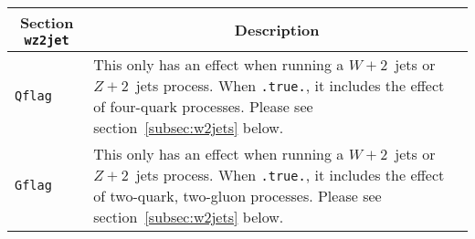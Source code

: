 	\begin{longtable}{p{1.5cm}p{12cm}}
		\hline
		\multicolumn{1}{c}{{\textbf{Section} \texttt{wz2jet}}} & \multicolumn{1}{c}{{\textbf{Description}}} \\
		\hline
		\texttt{Qflag} &
		This only has an effect when running a
		$W+2$~jets or $Z+2$~jets process. When {\tt.true.}, it includes the effect of four-quark processes. Please see section~\ref{subsec:w2jets}
		below. \\
		\texttt{Gflag} &
		This only has an effect when running a
		$W+2$~jets or $Z+2$~jets process. When {\tt.true.}, it includes the effect of two-quark, two-gluon processes.
                Please see section~\ref{subsec:w2jets}
		below. \\
		\hline
\end{longtable}
        
